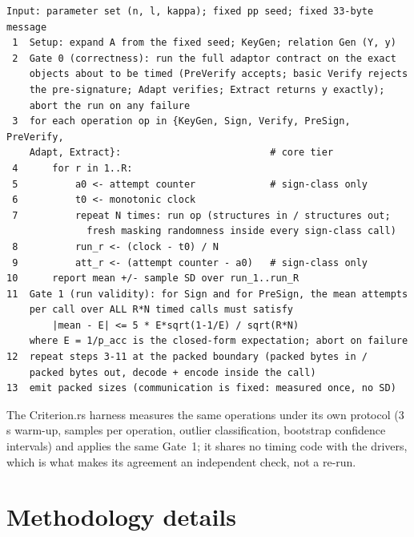 \begin{lstlisting}[language={},caption={The timing-benchmark procedure (both
tiers). $R=\benchReps$ repetitions; $N=\benchItersSign$ (sign-class) or
$\benchItersVerify$ (verify-class) iterations; the rejection gate follows
\cref{eq:rejacc}.},label={lst:benchalg}]
Input: parameter set (n, l, kappa); fixed pp seed; fixed 33-byte message
 1  Setup: expand A from the fixed seed; KeyGen; relation Gen (Y, y)
 2  Gate 0 (correctness): run the full adaptor contract on the exact
    objects about to be timed (PreVerify accepts; basic Verify rejects
    the pre-signature; Adapt verifies; Extract returns y exactly);
    abort the run on any failure
 3  for each operation op in {KeyGen, Sign, Verify, PreSign, PreVerify,
    Adapt, Extract}:                          # core tier
 4      for r in 1..R:
 5          a0 <- attempt counter             # sign-class only
 6          t0 <- monotonic clock
 7          repeat N times: run op (structures in / structures out;
              fresh masking randomness inside every sign-class call)
 8          run_r <- (clock - t0) / N
 9          att_r <- (attempt counter - a0)   # sign-class only
10      report mean +/- sample SD over run_1..run_R
11  Gate 1 (run validity): for Sign and for PreSign, the mean attempts
    per call over ALL R*N timed calls must satisfy
        |mean - E| <= 5 * E*sqrt(1-1/E) / sqrt(R*N)
    where E = 1/p_acc is the closed-form expectation; abort on failure
12  repeat steps 3-11 at the packed boundary (packed bytes in /
    packed bytes out, decode + encode inside the call)
13  emit packed sizes (communication is fixed: measured once, no SD)
\end{lstlisting}

The Criterion.rs harness measures the same operations under its own protocol
(3\,s warm-up, \critSamples{} samples per operation, outlier classification,
bootstrap confidence intervals) and applies the same Gate~1; it shares no
timing code with the drivers, which is what makes its agreement an independent
check, not a re-run.

\section{Methodology details}
\label{app:methoddetail}

